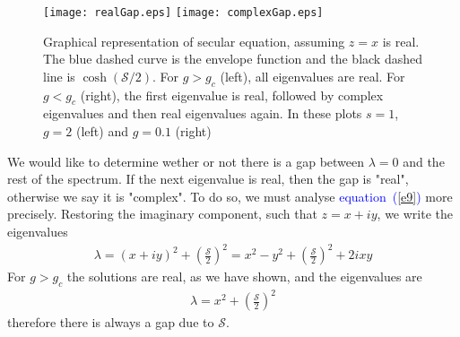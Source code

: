 \documentclass[aps,pre,floats,floatfix,fleqn,notitlepage]{revtex4-1}
\newcommand{\beq}{\begin{eqnarray}}
\newcommand{\eeq}{\end{eqnarray}}
\newcommand{\Eq}[1]{\textcolor{blue}{equation~(\ref{#1})}} %
\begin{document}
\begin{figure}[h]
\texttt{[image: realGap.eps]}
\texttt{[image: complexGap.eps]}
\caption{Graphical representation of secular equation, assuming $z=x$ is real. The blue dashed curve is the envelope function and the black dashed line is $\cosh(\mathcal{S}/2)$.  For $g>g_c$ (left), all eigenvalues are real. For $g<g_c$ (right), the first eigenvalue is real, followed by complex eigenvalues and then real eigenvalues again. In these plots $s=1$, $g=2$ (left) and $g=0.1$ (right)}
\label{fig1}
\end{figure}
We would like to determine wether or not there is a gap between $\lambda=0$ and the 
rest of the spectrum. 
If the next eigenvalue is real, then the gap is "real", otherwise we say it is "complex". 
To do so, we must analyse \Eq{e9} more precisely. 
Restoring the imaginary component, such that $z=x+iy$, we write the eigenvalues
%
\beq
\lambda = (x+iy)^2+\left(\frac{\mathcal{S}}{2}\right)^2 = x^2-y^2 + \left(\frac{\mathcal{S}}{2}\right)^2 +2ixy
\eeq
%
For $g>g_c$ the solutions are real, as we have shown, and the eigenvalues are 
%
\beq
\lambda = x^2+ \left(\frac{\mathcal{S}}{2}\right)^2
\eeq
%
therefore there is always a gap due to $\mathcal{S}$. 
%
\end{document}
